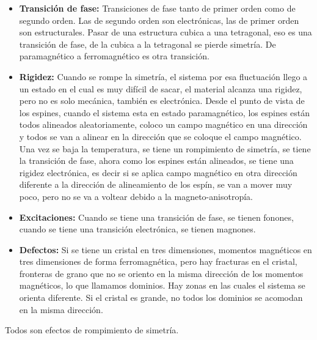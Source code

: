\documentclass[11pt,fleqn]{book}
\begin{document}
\begin{itemize}
    \item \textbf{Transición de fase:} Transiciones de fase tanto de primer orden como de segundo orden. Las de segundo orden son electrónicas, las de primer orden son estructurales. Pasar de una estructura cubica a una tetragonal, eso es una transición de fase, de la cubica a la tetragonal se pierde simetría. De paramagnético a ferromagnético es otra transición. 
    \item \textbf{Rigidez:} Cuando se rompe la simetría, el sistema por esa fluctuación llego a un estado en el cual es muy difícil de sacar, el material alcanza una rigidez, pero no es solo mecánica, también es electrónica. Desde el punto de vista de los espines, cuando el sistema esta en estado paramagnético, los espines están todos alineados aleatoriamente, coloco un campo magnético en una dirección y todos se van a alinear en la dirección que se coloque el campo magnético. Una vez se baja la temperatura, se tiene un rompimiento de simetría, se tiene la transición de fase, ahora como los espines están alineados, se tiene una rigidez electrónica, es decir si se aplica campo magnético en otra dirección diferente a la dirección de alineamiento de los espín, se van a mover muy poco, pero no se va a voltear debido a la magneto-anisotropía.
    \item \textbf{Excitaciones:} Cuando se tiene una transición de fase, se tienen fonones, cuando se tiene una transición electrónica, se tienen magnones. 
    \item \textbf{Defectos:} Si se tiene un cristal en tres dimensiones, momentos magnéticos en tres dimensiones de forma ferromagnética, pero hay fracturas en el cristal, fronteras de grano que no se oriento en la misma dirección de los momentos magnéticos, lo que llamamos dominios. Hay zonas en las cuales el sistema se orienta diferente. Si el cristal es grande, no todos los dominios se acomodan en la misma dirección.  

\end{itemize}


Todos son efectos de rompimiento de simetría.

\end{document}
